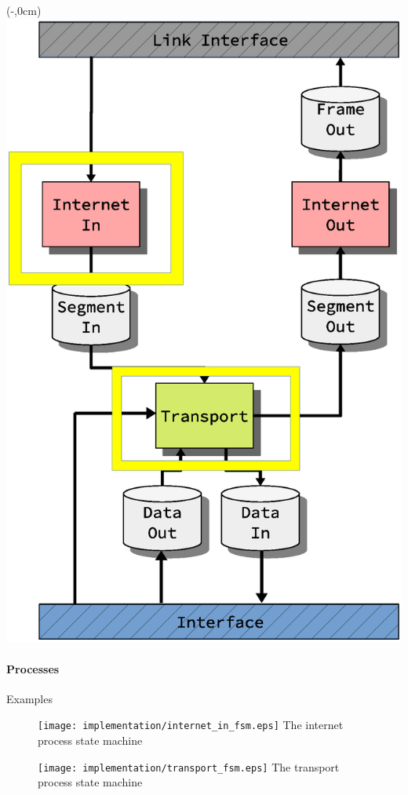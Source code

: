 \begin{frame}[fragile]
    \begin{textblock*}{\displayThumbnail}(\paperwidth-\displayThumbnail-0.2cm,0cm) %
        \colorbox{white}{\includegraphics[width=\textwidth]{implementation/design_2_state_specific.eps}}
    \end{textblock*}
    \frametitle{\ImplementationTitle}
    \framesubtitle{Processes}
    Examples\\
    \begin{minipage}[t]{0.5\textwidth}
        \begin{figure}
            \centering
            \texttt{[image: implementation/internet\_in\_fsm.eps]}
            The internet process state machine
        \end{figure}
    \end{minipage}%
    \hfill%
    \begin{minipage}[t]{0.5\textwidth}
        \begin{figure}
            \centering
            \texttt{[image: implementation/transport\_fsm.eps]}
            The transport process state machine
        \end{figure}
    \end{minipage}
\end{frame}

